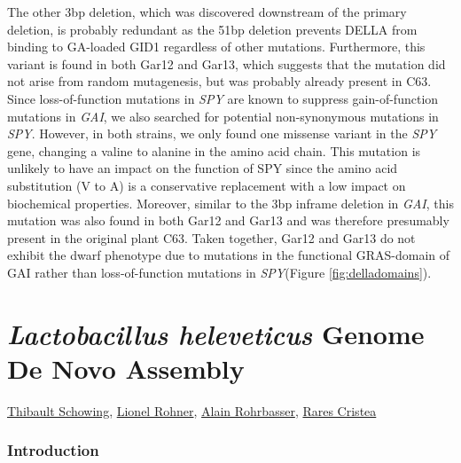 \documentclass[10pt,a4paper]{article}
\begin{document}
\noindent The other 3bp deletion, which was discovered downstream of the primary deletion, is probably redundant as the 51bp deletion prevents DELLA from binding to GA-loaded GID1 regardless of other mutations. Furthermore, this variant is found in both Gar12 and Gar13, which suggests that the mutation did not arise from random mutagenesis, but was probably already present in C63. Since loss-of-function mutations in \textit{SPY} are known to suppress gain-of-function mutations in \textit{GAI}, we also searched for potential non-synonymous mutations in \textit{SPY}. However, in both strains, we only found one missense variant in the \textit{SPY} gene, changing a valine to alanine in the amino acid chain. This mutation is unlikely to have an impact on the function of SPY since the amino acid substitution (V to A) is a conservative replacement with a low impact on biochemical properties. Moreover, similar to the 3bp inframe deletion in \textit{GAI}, this mutation was also found in both Gar12 and Gar13 and was therefore presumably present in the original plant C63. Taken together, Gar12 and Gar13 do not exhibit the dwarf phenotype due to mutations in the functional GRAS-domain of GAI rather than loss-of-function mutations in \textit{SPY}(Figure \ref{fig:delladomains}).





\newpage
\part*{\Large \textit{Lactobacillus heleveticus} Genome De Novo Assembly}

\href{mailto:thibault.schowing@unifr.ch}{Thibault Schowing}, \href{mailto:lio_roh@students.unibe.ch}{Lionel Rohner},
\href{mailto:alain.rohrbasser.unifr.ch}{Alain Rohrbasser},
\href{mailto:rares.cristea@unifr.ch}{Rares Cristea}\\

\section*{\large Introduction}
\end{document}
